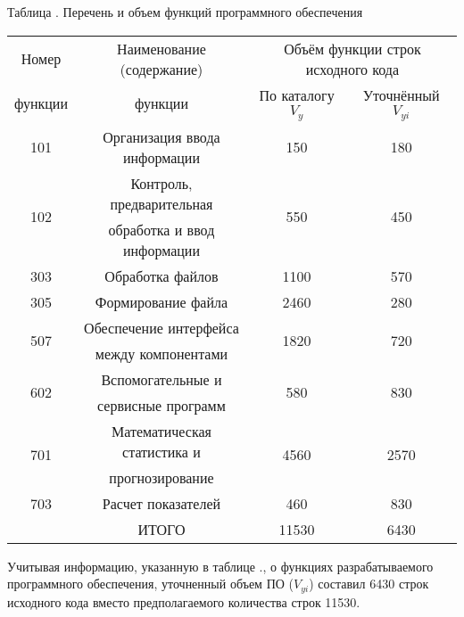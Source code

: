 {	{\begin{Center} 
		\par Таблица \thechaptercntr .\thetablecntr \spc {--} Перечень и объем функций программного обеспечения 

		\begin{tabular}{|c|c|c|c|}
		\hline
		Номер  				 & Наименование (содержание) 			& \multicolumn{2}{c|}{Объём функции строк исходного кода} \\ \cline{3-4}
  		функции			     & функции								& По каталогу $V_y$     & Уточнённый $V_{yi}$ 			  \\ \hline
		101 				 & Организация ввода информации         & 150 				    & 180 					          \\ \hline
		\multirow{2}{*}{102} & Контроль, предварительная  			& \multirow{2}{*}{550}  & \multirow{2}{*}{450} 			  \\
		                     & обработка и ввод информации			&                       &                      		      \\ \hline
		303                  & Обработка файлов						& 1100				    & 570							  \\ \hline
		305                  & Формирование файла					& 2460				    & 280							  \\ \hline
		\multirow{2}{*}{507} & Обеспечение интерфейса				& \multirow{2}{*}{1820} & \multirow{2}{*}{720} 			  \\
							 & между компонентами        			&                       &                      		      \\ \hline
		\multirow{2}{*}{602} & Вспомогательные и 					& \multirow{2}{*}{580}  & \multirow{2}{*}{830}			  \\ 
							 & сервисные программ        			&                       &                      		      \\ \hline
		\multirow{2}{*}{701} & Математическая статистика и			& \multirow{2}{*}{4560} & \multirow{2}{*}{2570}			  \\ 
							 & прогнозирование	        			&                       &                      		      \\ \hline
		703                  & Расчет показателей					& 460				    & 830							  \\ \hline
		                     & ИТОГО								& 11530				    & 6430							  \\ \hline
	\end{tabular} \end{Center}}

	\formulaspace

	\redline Учитывая информацию, указанную в таблице \thechaptercntr .\thetablecntr, о функциях разрабатываемого программного обеспечения, уточненный объем ПО ($V_{yi}$) составил 6430 строк исходного кода вместо предполагаемого количества строк 11530. \addtocounter{tablecntr}{1}

	\par
}

